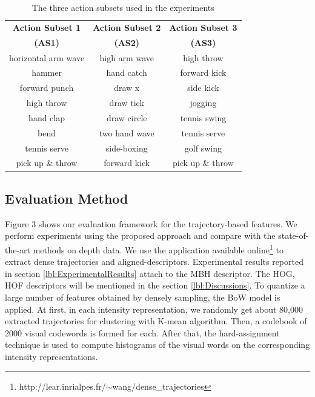 \documentclass[review]{elsarticle}
\begin{document}
\begin{table}
	\begin{center}
		\begin{tabular}{c|c|c}
		
		{\bf Action Subset 1} & {\bf Action Subset 2} & {\bf Action Subset 3} \\
		{\bf(AS1)} & {\bf(AS2)} & {\bf(AS3)} \\
		\hline
		horizontal arm wave &  high arm wave &     high throw \\
		
		        hammer &     hand catch &   forward kick \\
		
		 forward punch &         draw x &      side kick \\
		
		    high throw &      draw tick &        jogging \\
		
		     hand clap &    draw circle &   tennis swing \\
		
		          bend &  two hand wave &   tennis serve \\
		
		  tennis serve &    side-boxing &     golf swing \\
		
		pick up \& throw &   forward kick & pick up \& throw \\
		
		\end{tabular}
	\end{center}
	\caption{\label{lbl:3ActionSubsets}The three action subsets used in the experiments}
\end{table}

\subsection{Evaluation Method}


Figure 3 shows our evaluation framework for the trajectory-based features. We perform experiments using the proposed approach and compare with the state-of-the-art methods on depth data. We use the application available online\footnote{http://lear.inrialpes.fr/$\sim$wang/dense\_trajectories} to extract dense trajectories and aligned-descriptors. Experimental results reported in section \ref{lbl:ExperimentalResults} attach to the MBH descriptor. The HOG, HOF descriptors will be mentioned in the section \ref{lbl:Discussions}. To quantize a large number of features obtained by densely sampling, the BoW model is applied. At first, in each intensity representation, we randomly get about 80,000 extracted trajectories for clustering with K-mean algorithm. Then, a codebook of 2000 visual codewords is formed for each. After that, the hard-assignment technique is used to compute histograms of the visual words on the corresponding intensity representations.
\end{document}
